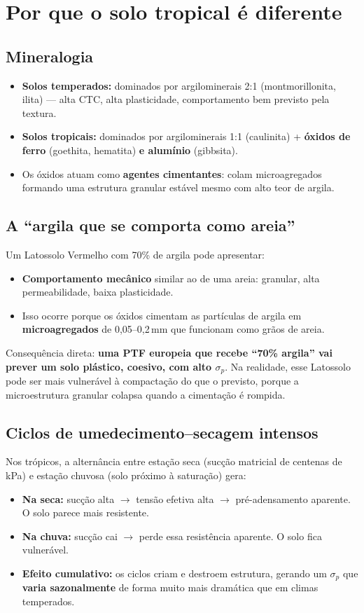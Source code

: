 \documentclass[12pt,a4paper]{article}
\newcommand{\Section}[1]{\needspace{12\baselineskip}\section{#1}}
\newcommand{\Subsection}[1]{\needspace{10\baselineskip}\subsection{#1}}
\begin{document}
\Section{Por que o solo tropical é diferente}

\Subsection{Mineralogia}

\begin{itemize}
  \item \textbf{Solos temperados:} dominados por argilominerais 2:1 (montmorillonita, ilita) --- alta CTC, alta plasticidade, comportamento bem previsto pela textura.
  \item \textbf{Solos tropicais:} dominados por argilominerais 1:1 (caulinita) + \textbf{óxidos de ferro} (goethita, hematita) \textbf{e alumínio} (gibbsita).
  \item Os óxidos atuam como \textbf{agentes cimentantes}: colam microagregados formando uma estrutura granular estável mesmo com alto teor de argila.
\end{itemize}

\Subsection{A ``argila que se comporta como areia''}

Um Latossolo Vermelho com 70\% de argila pode apresentar:
\begin{itemize}
  \item \textbf{Comportamento mecânico} similar ao de uma areia: granular, alta permeabilidade, baixa plasticidade.
  \item Isso ocorre porque os óxidos cimentam as partículas de argila em \textbf{microagregados} de 0,05--0,2\,mm que funcionam como grãos de areia.
\end{itemize}

Consequência direta: \textbf{uma PTF europeia que recebe ``70\% argila'' vai prever um solo plástico, coesivo, com alto $\sigma_p$}. Na realidade, esse Latossolo pode ser mais vulnerável à compactação do que o previsto, porque a microestrutura granular colapsa quando a cimentação é rompida.

\Subsection{Ciclos de umedecimento--secagem intensos}

Nos trópicos, a alternância entre estação seca (sucção matricial de centenas de kPa) e estação chuvosa (solo próximo à saturação) gera:

\begin{itemize}
  \item \textbf{Na seca:} sucção alta $\to$ tensão efetiva alta $\to$ pré-adensamento aparente. O solo parece mais resistente.
  \item \textbf{Na chuva:} sucção cai $\to$ perde essa resistência aparente. O solo fica vulnerável.
  \item \textbf{Efeito cumulativo:} os ciclos criam e destroem estrutura, gerando um $\sigma_p$ que \textbf{varia sazonalmente} de forma muito mais dramática que em climas temperados.
\end{itemize}
\end{document}
